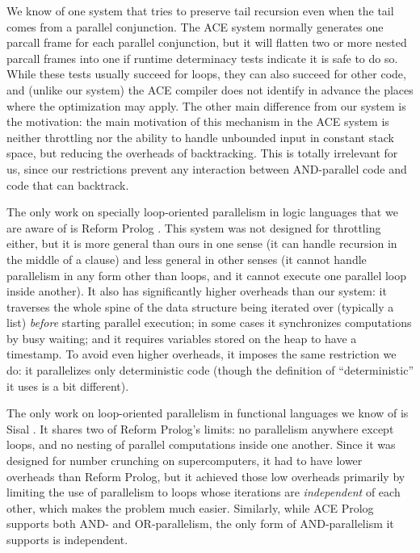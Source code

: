 We know of one system that tries to preserve tail recursion
even when the tail comes from a parallel conjunction.
The ACE system \cite{gupta01:optimization_for_parallel_nodet_code}
normally generates one parcall frame for each parallel conjunction,
but it will flatten two or more nested parcall frames into one
if runtime determinacy tests indicate it is safe to do so.
While these tests usually succeed for loops,
they can also succeed for other code,
and (unlike our system) the ACE compiler does not identify in advance
the places where the optimization may apply.
The other main difference from our system is the motivation:
the main motivation of this mechanism in the ACE system is
neither throttling
nor the ability to handle unbounded input in constant stack space,
but reducing the overheads of backtracking.
This is totally irrelevant for us,
since our restrictions prevent any interaction
between AND-parallel code and code that can backtrack.

The only work on specially loop-oriented parallelism in logic languages
that we are aware of is Reform Prolog \cite{bevemyr:reform}.
This system was not designed for throttling either,
but it is more general than ours in one sense
(it can handle recursion in the middle of a clause)
and less general in other senses
(it cannot handle parallelism in any form other than loops,
and it cannot execute one parallel loop inside another).
It also has significantly higher overheads than our system:
it traverses the whole spine of the data structure being iterated over
(typically a list) \emph{before} starting parallel execution;
in some cases it synchronizes computations by busy waiting;
and it requires variables stored on the heap to have a timestamp.
To avoid even higher overheads,
it imposes the same restriction we do:
it parallelizes only deterministic code
(though the definition of ``deterministic'' it uses is a bit different).

The only work on loop-oriented parallelism in functional languages
we know of is Sisal \cite{sisal}.
It shares two of Reform Prolog's limits:
no parallelism anywhere except loops, and
no nesting of parallel computations inside one another.
Since it was designed for number crunching on supercomputers,
it had to have lower overheads than Reform Prolog,
but it achieved those low overheads
primarily by limiting the use of parallelism
to loops whose iterations are \emph{independent} of each other,
which makes the problem much easier.
Similarly, while ACE Prolog supports both AND- and OR-parallelism,
the only form of AND-parallelism it supports is independent.

